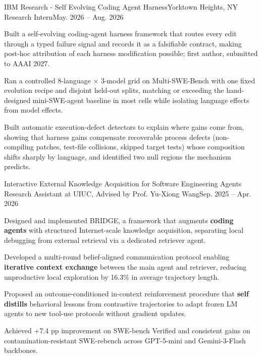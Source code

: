     \resumeSubHeadingListStart

    \resumeSubheading
      {IBM Research - Self Evolving Coding Agent Harness}{Yorktown Heights, NY}
      {Research Intern}{May. 2026 -- Aug. 2026}
      \resumeItemListStart
        \item{Built a self-evolving coding-agent harness framework that routes every edit through a typed failure signal and records it as a falsifiable contract, making post-hoc attribution of each harness modification possible; first author, submitted to AAAI 2027.}
        \item{Ran a controlled 8-language × 3-model grid on Multi-SWE-Bench with one fixed evolution recipe and disjoint held-out splits, matching or exceeding the hand-designed mini-SWE-agent baseline in most cells while isolating language effects from model effects.}
        \item{Built automatic execution-defect detectors to explain where gains come from, showing that harness gains compensate recoverable process defects (non-compiling patches, test-file collisions, skipped target tests) whose composition shifts sharply by language, and identified two null regions the mechanism predicts.}
      \resumeItemListEnd

    \resumeSubheading
      {Interactive External Knowledge Acquisition for Software Engineering Agents}{}
      {Research Assistant at UIUC, Advised by Prof. Yu-Xiong Wang}{Sep. 2025 -- Apr. 2026}
      \resumeItemListStart
        \item{Designed and implemented BRIDGE, a framework that augments \textbf{coding agents} with structured Internet-scale knowledge acquisition, separating local debugging from external retrieval via a dedicated retriever agent.}
\item{Developed a multi-round belief-aligned communication protocol enabling \textbf{iterative context exchange} between the main agent and retriever, reducing unproductive local exploration by 16.3\% in average trajectory length.}
\item{Proposed an outcome-conditioned in-context reinforcement procedure that \textbf{self distills} behavioral lessons from contrastive trajectories to adapt frozen LM agents to new tool-use protocols without gradient updates.}
\item{Achieved +7.4 pp improvement on SWE-bench Verified and consistent gains on contamination-resistant SWE-rebench across GPT-5-mini and Gemini-3-Flash backbones.}
    \resumeItemListEnd
      
